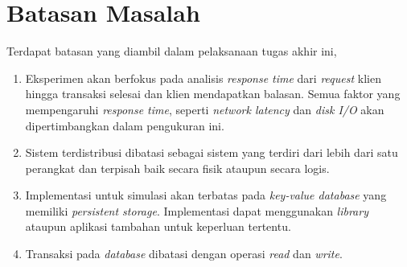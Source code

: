 \section{Batasan Masalah}

Terdapat batasan yang diambil dalam pelaksanaan tugas akhir ini,

\begin{enumerate}
    \item Eksperimen akan berfokus pada analisis \textit{response time} dari \textit{request} klien hingga transaksi selesai dan klien mendapatkan balasan. Semua faktor yang mempengaruhi \textit{response time}, seperti \textit{network latency} dan \textit{disk I/O} akan dipertimbangkan dalam pengukuran ini.
    \item Sistem terdistribusi dibatasi sebagai sistem yang terdiri dari lebih dari satu perangkat dan terpisah baik secara fisik ataupun secara logis.
    \item Implementasi untuk simulasi akan terbatas pada \textit{key-value database} yang memiliki \textit{persistent storage}. Implementasi dapat menggunakan \textit{library} ataupun aplikasi tambahan untuk keperluan tertentu.
    \item Transaksi pada \textit{database} dibatasi dengan operasi \textit{read} dan \textit{write}.
\end{enumerate}
